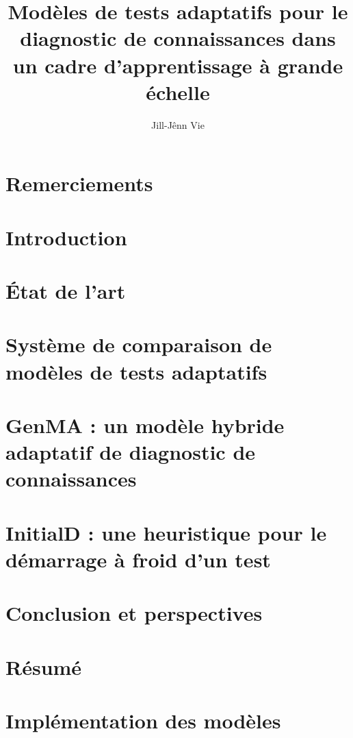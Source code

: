 \documentclass[12pt,a4paper]{book}
\title{Modèles de tests adaptatifs pour le diagnostic de connaissances dans un cadre d'apprentissage à grande échelle}
\author{Jill-Jênn Vie}
\begin{document}

\restoregeometry

\chapter*{Remerciements}


\printnomenclature

\clearpage
\tableofcontents

\chapter{Introduction}


\chapter{État de l'art}


\chapter{Système de comparaison de modèles de tests adaptatifs}



\chapter{GenMA : un modèle hybride adaptatif de diagnostic de connaissances}




\chapter{InitialD : une heuristique pour le démarrage à froid d'un test}




\chapter{Conclusion et perspectives}


\chapter*{Résumé}


\clearpage
\listoffigures
\listoftables

\appendix

\chapter{Implémentation des modèles}


\printbibliography
\end{document}
